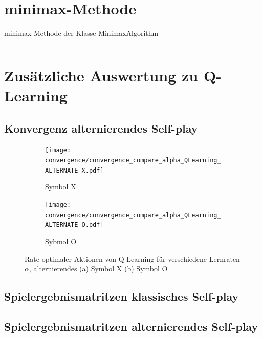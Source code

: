 \chapter{minimax-Methode}
\label{chap:minimax_listing}
\begin{longlisting}
\caption{minimax-Methode der Klasse MinimaxAlgorithm}
\label{listing:minimax}
\inputminted{java}{04_Artefakte/03_Listings/minimax.java}
\end{longlisting}



\chapter{Zusätzliche Auswertung zu Q-Learning}
\label{chap:app_qlearning}
\section{Konvergenz alternierendes Self-play}

\begin{figure}[h]
\centering
\begin{subfigure}[b]{0.75\textwidth}
    \centering
   \texttt{[image: convergence/convergence\_compare\_alpha\_QLearning\_ALTERNATE\_X.pdf]}
   \caption{Symbol X}
   \label{fig:convergence_compare_alpha_QLearning_ALTERNATE_X} 
\end{subfigure}

\begin{subfigure}[b]{0.75\textwidth}
    \centering
   \texttt{[image: convergence/convergence\_compare\_alpha\_QLearning\_ALTERNATE\_O.pdf]}
   \caption{Sybmol O}
   \label{fig:convergence_compare_alpha_QLearning_ALTERNATE_O}
\end{subfigure}
\caption[Rate optimaler Aktionen Q-Learning unterschiedliche Lernraten, alternierendes \splay]{Rate optimaler Aktionen von Q-Learning für verschiedene Lernraten $\alpha$, alternierendes \splay (a) Symbol X (b) Symbol O}
\label{fig:convergence_compare_alpha_QLearning_ALTERNATE}
\end{figure}

\section{Spielergebnismatritzen klassisches Self-play}



\section{Spielergebnismatritzen alternierendes Self-play}

